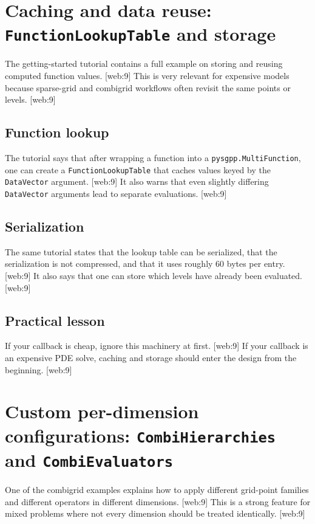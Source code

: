 \documentclass[11pt,a4paper]{article}
\begin{document}
\section{Caching and data reuse: \texttt{FunctionLookupTable} and storage}

The getting-started tutorial contains a full example on storing and reusing computed function values. [web:9]  
This is very relevant for expensive models because sparse-grid and combigrid workflows often revisit the same points or levels. [web:9]  

\subsection{Function lookup}
The tutorial says that after wrapping a function into a \texttt{pysgpp.MultiFunction}, one can create a \texttt{FunctionLookupTable} that caches values keyed by the \texttt{DataVector} argument. [web:9]  
It also warns that even slightly differing \texttt{DataVector} arguments lead to separate evaluations. [web:9]  

\subsection{Serialization}
The same tutorial states that the lookup table can be serialized, that the serialization is not compressed, and that it uses roughly 60 bytes per entry. [web:9]  
It also says that one can store which levels have already been evaluated. [web:9]  

\subsection{Practical lesson}
If your callback is cheap, ignore this machinery at first. [web:9]  
If your callback is an expensive PDE solve, caching and storage should enter the design from the beginning. [web:9]  

\section{Custom per-dimension configurations: \texttt{CombiHierarchies} and \texttt{CombiEvaluators}}

One of the combigrid examples explains how to apply different grid-point families and different operators in different dimensions. [web:9]  
This is a strong feature for mixed problems where not every dimension should be treated identically. [web:9]  
\end{document}
